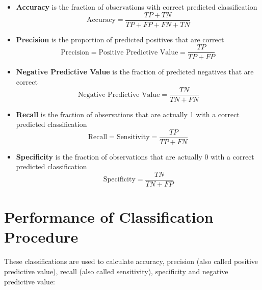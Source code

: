 \documentclass[a4paper,12pt]{article}
\begin{document}
	\begin{itemize}
		\item  \textbf{Accuracy} is the fraction of observations with correct predicted classification
		\[ \mbox{Accuracy}=\frac{TP+TN}{TP+FP+FN+TN}\]
		
		
		\item \textbf{Precision} is the proportion of predicted positives that are correct
		\[
		\mbox{Precision} = \mbox{Positive Predictive Value} =\frac{TP}{TP+FP} \, \]
		
		\item \textbf{Negative Predictive Value} is the  fraction of predicted negatives that are correct
		\[\mbox{Negative Predictive Value} = \frac{TN}{TN+FN}\]
		
		\item \textbf{Recall} is the fraction of observations that are actually 1 with a correct predicted classification
		\[ 
		\mbox{Recall} = \mbox{Sensitivity} = \frac{TP}{TP+FN} \,  \]
		
		\item \textbf{Specificity} is the fraction of observations that are actually 0 with a correct predicted classification
		\[ \mbox{Specificity} = \frac{TN}{TN+FP} \]
		
	\end{itemize}



\section{Performance of Classification Procedure}
	
	These classifications are used to calculate accuracy, precision (also called positive predictive value), recall (also called sensitivity), specificity and negative predictive value:
	
\end{document}
